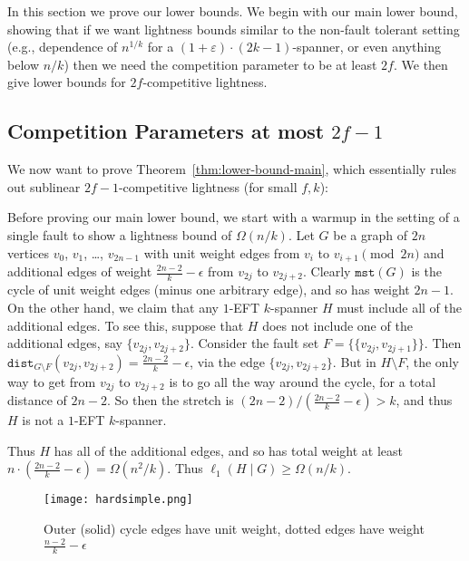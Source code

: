 \documentclass{article}
\theoremstyle{plain}
\theoremstyle{definition}
\newcommand{\dist}{\texttt{dist}}
\newcommand{\eps}{\varepsilon}
\newcommand{\mst}{\texttt{mst}}
\begin{document}
In this section we prove our lower bounds.  We begin with our main lower bound, showing that if we want lightness bounds similar to the non-fault tolerant setting (e.g., dependence of $n^{1/k}$ for a $(1+\eps)\cdot (2k-1)$-spanner, or even anything below $n/k$) then we need the competition parameter to be at least $2f$.  We then give lower bounds for $2f$-competitive lightness.

\subsection{Competition Parameters at most $2f-1$} \label{sec:lowersmallcompetitive}
We now want to prove Theorem~\ref{thm:lower-bound-main}, which essentially rules out sublinear $2f-1$-competitive lightness (for small $f, k$): 

\bicriterialower*

Before proving our main lower bound, we start with a warmup in the setting of a single fault to show a lightness bound of $\Omega(n/k)$. Let $G$ be a graph of $2n$ vertices $v_0$, $v_1$, \ldots, $v_{2n-1}$ with unit weight edges from $v_i$ to $v_{i+1} \pmod{2n}$  and additional edges of weight $\frac{2n-2}{k} - \epsilon$ from $v_{2j}$ to $v_{2j+2}$. Clearly $\mst(G)$ is the cycle of unit weight edges (minus one arbitrary edge), and so has weight $2n-1$.  On the other hand, we claim that any $1$-EFT $k$-spanner $H$ must include all of the additional edges.  To see this, suppose that $H$ does not include one of the additional edges, say $\{v_{2j}, v_{2j+2}\}$.  Consider the fault set $F = \{\{v_{2j}, v_{2j+1}\}\}$.  Then $\dist_{G \setminus F}(v_{2j}, v_{2j+2}) = \frac{2n-2}{k} - \epsilon$, via the edge $\{v_{2j}, v_{2j+2}\}$.  But in $H \setminus F$, the only way to get from $v_{2j}$ to $v_{2j+2}$ is to go all the way around the cycle, for a total distance of $2n-2$.  So then the stretch is $(2n-2) / \left(\frac{2n-2}{k} - \epsilon\right) > k$, and thus $H$ is not a $1$-EFT $k$-spanner.  

Thus $H$ has all of the additional edges, and so has total weight at least $n \cdot \left(\frac{2n-2}{k} - \epsilon\right) = \Omega(n^2 / k)$.  Thus $\ell_1(H \mid G) \geq \Omega(n/k)$.

\begin{figure}[h]
    \centering
    \texttt{[image: hardsimple.png]}
    \caption{Outer (solid) cycle edges have unit weight, dotted edges have weight $\frac{n-2}{k} - \epsilon$}
    \label{fig:enter-label}
\end{figure}
\end{document}
